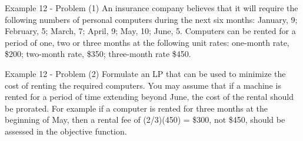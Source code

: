 \begin{frame}{Example 12 - Problem (1)}
An insurance company believes that it will require the following numbers of
personal computers during the next six months: January, 9; February, 5; March,
7; April, 9; May, 10; June, 5. Computers can be rented for a period of one,
two or three months at the following unit rates: one-month rate, \$200;
two-month rate, \$350; three-month rate \$450.
\end{frame}

\begin{frame}{Example 12 - Problem (2)}
Formulate an LP that can be used to minimize the cost of renting the required
computers. You may assume that if a machine is rented for a period of time
extending beyond June, the cost of the rental should be prorated. For example
if a computer is rented for three months at the beginning of May, then a rental
fee of (2/3)(450) = \$300, not \$450, should be assessed in the objective
function.
\end{frame}
